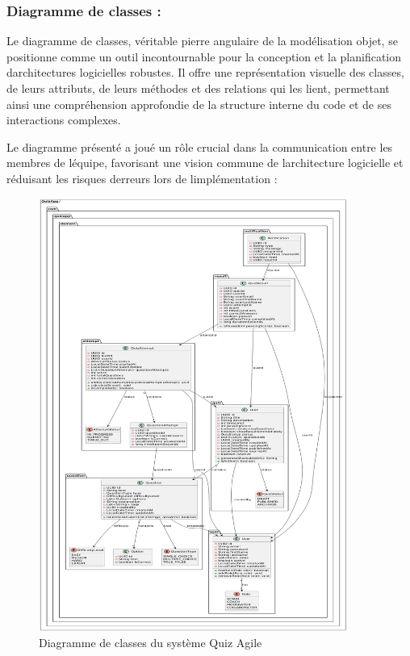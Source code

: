 \documentclass[12pt,a4paper,twoside]{report}
\begin{document}
\hypertarget{diagramme-de-classes}{%
\subsubsection{\texorpdfstring{Diagramme de classes :
}{Diagramme de classes : }}\label{diagramme-de-classes}}

Le diagramme de classes, véritable pierre angulaire de la modélisation
objet, se positionne comme un outil incontournable pour la conception et
la planification d\textquotesingle architectures logicielles robustes.
Il offre une représentation visuelle des classes, de leurs attributs, de
leurs méthodes et des relations qui les lient, permettant ainsi une
compréhension approfondie de la structure interne du code et de ses
interactions complexes.

Le diagramme présenté a joué un rôle crucial dans la communication entre
les membres de l\textquotesingle équipe, favorisant une vision commune
de l\textquotesingle architecture logicielle et réduisant les risques
d\textquotesingle erreurs lors de l\textquotesingle implémentation :

\begin{figure}[H]
\centering
\includegraphics[width=0.9\textwidth]{latex_media/media/image16.png}
\caption{Diagramme de classes du système Quiz Agile}
\label{fig:diagramme-classes}
\end{figure}
\end{document}
